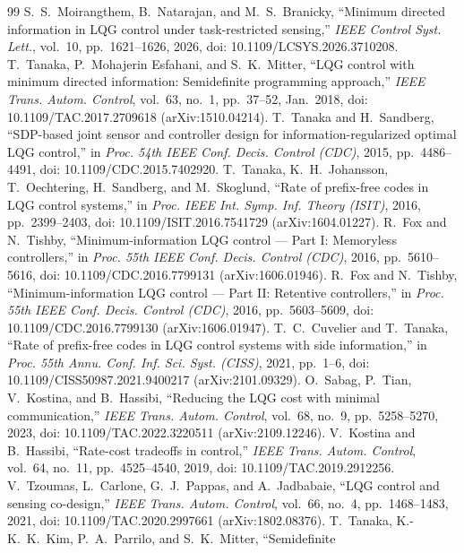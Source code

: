 \begin{thebibliography}{99}
S.~S.~Moirangthem, B.~Natarajan, and M.~S.~Branicky, ``Minimum directed information
in LQG control under task-restricted sensing,'' \emph{IEEE Control Syst. Lett.},
vol.~10, pp.~1621--1626, 2026, doi: 10.1109/LCSYS.2026.3710208.
T.~Tanaka, P.~Mohajerin Esfahani, and S.~K.~Mitter, ``LQG control with minimum
directed information: Semidefinite programming approach,'' \emph{IEEE Trans. Autom.
Control}, vol.~63, no.~1, pp.~37--52, Jan.~2018, doi: 10.1109/TAC.2017.2709618
(arXiv:1510.04214).
T.~Tanaka and H.~Sandberg, ``SDP-based joint sensor and controller design for
information-regularized optimal LQG control,'' in \emph{Proc. 54th IEEE Conf.
Decis. Control (CDC)}, 2015, pp.~4486--4491, doi: 10.1109/CDC.2015.7402920.
T.~Tanaka, K.~H.~Johansson, T.~Oechtering, H.~Sandberg, and M.~Skoglund, ``Rate of
prefix-free codes in LQG control systems,'' in \emph{Proc. IEEE Int. Symp. Inf.
Theory (ISIT)}, 2016, pp.~2399--2403, doi: 10.1109/ISIT.2016.7541729
(arXiv:1604.01227).
R.~Fox and N.~Tishby, ``Minimum-information LQG control --- Part I: Memoryless
controllers,'' in \emph{Proc. 55th IEEE Conf. Decis. Control (CDC)}, 2016,
pp.~5610--5616, doi: 10.1109/CDC.2016.7799131 (arXiv:1606.01946).
R.~Fox and N.~Tishby, ``Minimum-information LQG control --- Part II: Retentive
controllers,'' in \emph{Proc. 55th IEEE Conf. Decis. Control (CDC)}, 2016,
pp.~5603--5609, doi: 10.1109/CDC.2016.7799130 (arXiv:1606.01947).
T.~C.~Cuvelier and T.~Tanaka, ``Rate of prefix-free codes in LQG control systems
with side information,'' in \emph{Proc. 55th Annu. Conf. Inf. Sci. Syst. (CISS)},
2021, pp.~1--6, doi: 10.1109/CISS50987.2021.9400217 (arXiv:2101.09329).
O.~Sabag, P.~Tian, V.~Kostina, and B.~Hassibi, ``Reducing the LQG cost with minimal
communication,'' \emph{IEEE Trans. Autom. Control}, vol.~68, no.~9, pp.~5258--5270,
2023, doi: 10.1109/TAC.2022.3220511 (arXiv:2109.12246).
V.~Kostina and B.~Hassibi, ``Rate-cost tradeoffs in control,'' \emph{IEEE Trans.
Autom. Control}, vol.~64, no.~11, pp.~4525--4540, 2019, doi: 10.1109/TAC.2019.2912256.
V.~Tzoumas, L.~Carlone, G.~J.~Pappas, and A.~Jadbabaie, ``LQG control and sensing
co-design,'' \emph{IEEE Trans. Autom. Control}, vol.~66, no.~4, pp.~1468--1483,
2021, doi: 10.1109/TAC.2020.2997661 (arXiv:1802.08376).
T.~Tanaka, K.-K.~K.~Kim, P.~A.~Parrilo, and S.~K.~Mitter, ``Semidefinite

\end{thebibliography}

